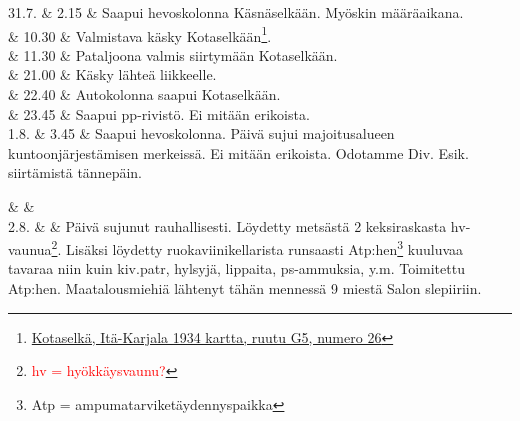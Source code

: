 \documentclass[11pt,a5paper,oneside]{book}
\begin{document}
\taulustop


31.7. & 2.15 & Saapui hevoskolonna Käsnäselkään. Myöskin määräaikana. \newline \\

& 10.30 & Valmistava käsky Kotaselkään\footnote{\href{https://www.google.fi/maps/place/61\%C2\%B031'09.9\%22N+32\%C2\%B033'31.8\%22E/}{Kotaselkä, Itä-Karjala 1934 kartta, ruutu G5, numero 26}}. \\

& 11.30 & Pataljoona valmis siirtymään Kotaselkään. \newline \\

& 21.00 & Käsky lähteä liikkeelle. \\

& 22.40 & Autokolonna saapui Kotaselkään. \\

& 23.45 & Saapui pp-rivistö. \newline Ei mitään erikoista. \newline\newline\newline\newline\newline\newline \\

1.8. & 3.45 & Saapui hevoskolonna. \newline Päivä sujui majoitusalueen kuntoonjärjestämisen merkeissä. Ei mitään erikoista. Odotamme Div. Esik. siirtämistä tännepäin. \\
\newpage

& & \newline\newline\newline \\

2.8. & & Päivä sujunut rauhallisesti. \newline Löydetty metsästä 2 keksiraskasta hv-vaunua\footnote{\textcolor{red}{hv = hyökkäysvaunu?}}. Lisäksi löydetty ruokaviinikellarista runsaasti Atp:hen\footnote{Atp = ampumatarviketäydennyspaikka} kuuluvaa tavaraa niin kuin kiv.patr, hylsyjä, lippaita, ps-ammuksia, y.m. Toimitettu Atp:hen. \newline Maatalousmiehiä lähtenyt tähän mennessä 9 miestä Salon slepiiriin. \\
\end{document}
